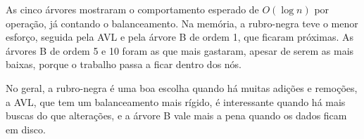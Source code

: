 As cinco árvores mostraram o comportamento esperado de $O(\log n)$ por operação, já contando o balanceamento. Na memória, a rubro-negra teve o menor esforço, seguida pela AVL e pela árvore B de ordem 1, que ficaram próximas. As árvores B de ordem 5 e 10 foram as que mais gastaram, apesar de serem as mais baixas, porque o trabalho passa a ficar dentro dos nós.

No geral, a rubro-negra é uma boa escolha quando há muitas adições e remoções, a AVL, que tem um balanceamento mais rígido, é interessante quando há mais buscas do que alterações, e a árvore B vale mais a pena quando os dados ficam em disco.
